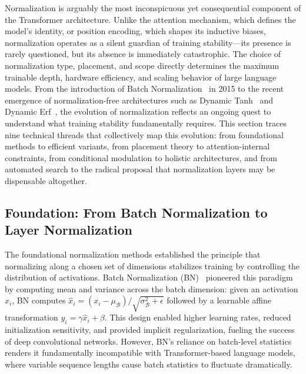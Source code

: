 
Normalization is arguably the most inconspicuous yet consequential component of the Transformer architecture.
Unlike the attention mechanism, which defines the model's identity, or position encoding, which shapes its inductive biases, normalization operates as a silent guardian of training stability---its presence is rarely questioned, but its absence is immediately catastrophic.
The choice of normalization type, placement, and scope directly determines the maximum trainable depth, hardware efficiency, and scaling behavior of large language models.
From the introduction of Batch Normalization~\cite{ioffe2015batch} in 2015 to the recent emergence of normalization-free architectures such as Dynamic Tanh~\cite{zhu2025transformers} and Dynamic Erf~\cite{chen2025stronger}, the evolution of normalization reflects an ongoing quest to understand what training stability fundamentally requires.
This section traces nine technical threads that collectively map this evolution: from foundational methods to efficient variants, from placement theory to attention-internal constraints, from conditional modulation to holistic architectures, and from automated search to the radical proposal that normalization layers may be dispensable altogether.

\subsection{Foundation: From Batch Normalization to Layer Normalization}

The foundational normalization methods established the principle that normalizing along a chosen set of dimensions stabilizes training by controlling the distribution of activations.
Batch Normalization (BN)~\cite{ioffe2015batch} pioneered this paradigm by computing mean and variance across the batch dimension: given an activation $x_i$, BN computes $\hat{x}_i = (x_i - \mu_\mathcal{B}) / \sqrt{\sigma^2_\mathcal{B} + \epsilon}$ followed by a learnable affine transformation $y_i = \gamma \hat{x}_i + \beta$.
This design enabled higher learning rates, reduced initialization sensitivity, and provided implicit regularization, fueling the success of deep convolutional networks.
However, BN's reliance on batch-level statistics renders it fundamentally incompatible with Transformer-based language models, where variable sequence lengths cause batch statistics to fluctuate dramatically.

